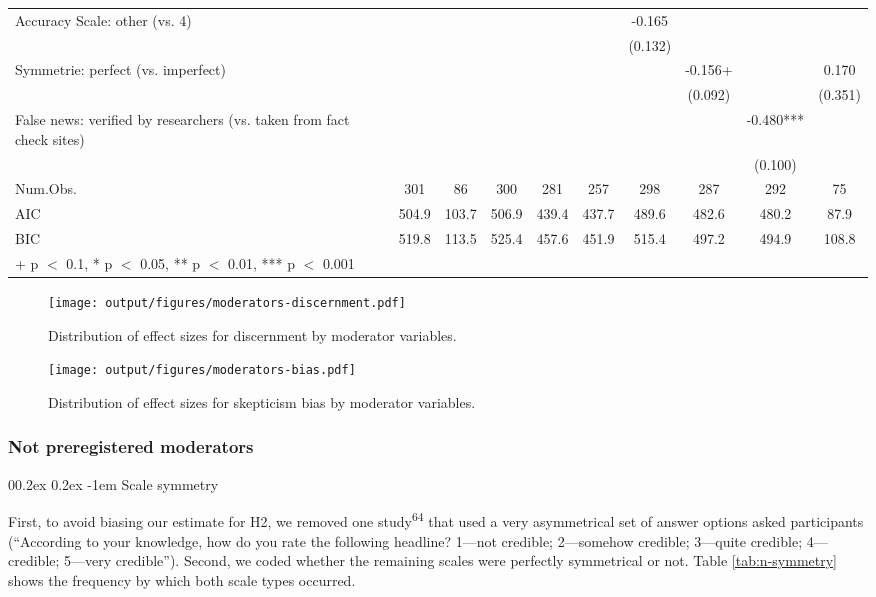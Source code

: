\documentclass[
  doc,floatsintext]{apa6}
\makeatletter
\let\oldparagraph\paragraph
\renewcommand{\paragraph}[1]{\oldparagraph{#1}\mbox{}}
\renewcommand{\paragraph}{\@startsection{paragraph}{4}{\parindent}%
  {0\baselineskip \@plus 0.2ex \@minus 0.2ex}%
  {-1em}%
  {\normalfont\normalsize\bfseries\itshape\typesectitle}}
\makeatother
\begin{document}
\begin{table}
{\begin{tabular}[t]{lccccccccc}
Accuracy Scale: other (vs. 4) &  &  &  &  &  & -0.165 &  &  & \\
 &  &  &  &  &  & (0.132) &  &  & \\
Symmetrie: perfect (vs. imperfect) &  &  &  &  &  &  & -0.156+ &  & 0.170\\
 &  &  &  &  &  &  & (0.092) &  & (0.351)\\
False news: verified by researchers (vs. taken from fact check sites) &  &  &  &  &  &  &  & -0.480*** & \\
 &  &  &  &  &  &  &  & (0.100) & \\
\midrule
Num.Obs. & 301 & 86 & 300 & 281 & 257 & 298 & 287 & 292 & 75\\
AIC & 504.9 & 103.7 & 506.9 & 439.4 & 437.7 & 489.6 & 482.6 & 480.2 & 87.9\\
BIC & 519.8 & 113.5 & 525.4 & 457.6 & 451.9 & 515.4 & 497.2 & 494.9 & 108.8\\
\bottomrule
\multicolumn{10}{l}{\rule{0pt}{1em}+ p $<$ 0.1, * p $<$ 0.05, ** p $<$ 0.01, *** p $<$ 0.001}\\
\end{tabular}}
\end{table}



\begin{figure}
\centering
\texttt{[image: output/figures/moderators-discernment.pdf]}
\caption{\label{fig:moderators-discernment}Distribution of effect sizes for discernment by moderator variables.}
\end{figure}



\begin{figure}
\centering
\texttt{[image: output/figures/moderators-bias.pdf]}
\caption{\label{fig:moderators-bias}Distribution of effect sizes for skepticism bias by moderator variables.}
\end{figure}

\subsubsection{Not preregistered moderators}\label{not-preregistered-moderators}

\paragraph{Scale symmetry}\label{scale-symmetry}

First, to avoid biasing our estimate for H2, we removed one study\textsuperscript{64} that used a very asymmetrical set of answer options asked participants (``According to your knowledge, how do you rate the following headline? 1---not credible; 2---somehow credible; 3---quite credible; 4---credible; 5---very credible''). Second, we coded whether the remaining scales were perfectly symmetrical or not. Table \ref{tab:n-symmetry} shows the frequency by which both scale types occurred.
\end{document}
